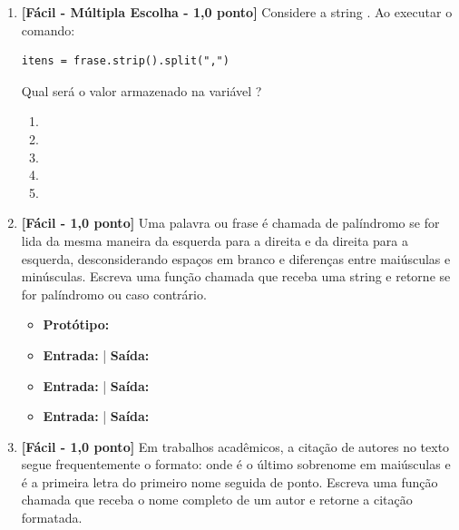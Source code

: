 \begin{enumerate}[label=\textbf{Q\arabic*.}, start=39]
\item \textbf{[Fácil - Múltipla Escolha - 1,0 ponto]} Considere a string . Ao executar o comando:
\begin{verbatim}
itens = frase.strip().split(",")
\end{verbatim}
Qual será o valor armazenado na variável ?

\begin{enumerate}[label=\textbf{(\Alph*)}]
    \item {}
    \item {}
    \item {}
    \item {}
    \item {}
\end{enumerate}



\vspace{0.4cm}

\item \textbf{[Fácil - 1,0 ponto]} Uma palavra ou frase é chamada de palíndromo se for lida da mesma maneira da esquerda para a direita e da direita para a esquerda, desconsiderando espaços em branco e diferenças entre maiúsculas e minúsculas. Escreva uma função chamada  que receba uma string e retorne  se for palíndromo ou  caso contrário.

\begin{itemize}[leftmargin=*]
    \item \textbf{Protótipo:}\newline {}
    \item \textbf{Entrada:}  | \textbf{Saída:} 
    \item \textbf{Entrada:}  | \textbf{Saída:} 
    \item \textbf{Entrada:}  | \textbf{Saída:} 
\end{itemize}



\vspace{0.4cm}

\item \textbf{[Fácil - 1,0 ponto]} Em trabalhos acadêmicos, a citação de autores no texto segue frequentemente o formato:  onde  é o último sobrenome em maiúsculas e  é a primeira letra do primeiro nome seguida de ponto. Escreva uma função chamada  que receba o nome completo de um autor e retorne a citação formatada.


\end{enumerate}
